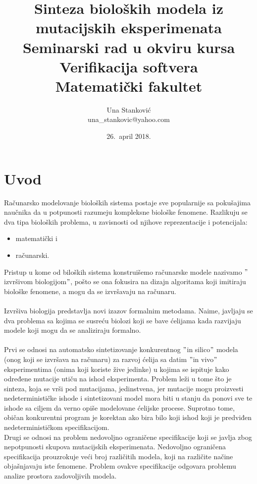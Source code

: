 \documentclass[a4paper]{article}
\begin{document}
\title{Sinteza bioloških modela iz mutacijskih eksperimenata\\ \small{Seminarski rad u okviru kursa\\Verifikacija softvera\\ Matematički fakultet}}

\author{Una Stanković\\una\_stankovic@yahoo.com}
\date{26.~april 2018.}
\maketitle

\tableofcontents

\newpage

\section{Uvod}
\label{sec:uvod}
Računarsko modelovanje bioloških sistema postaje sve popularnije sa pokušajima naučnika da u potpunosti razumeju kompleksne biološke fenomene.
Razlikuju se dva tipa bioloških problema, u zavisnosti od njihove reprezentacije i potencijala:
\begin{itemize}
\item matematički i
\item računarski.
\end{itemize} 
Pristup u kome od biloških sistema konstruišemo računarske modele nazivamo $"$izvršivom biologijom$"$, pošto se ona fokusira na dizajn algoritama koji imitiraju biološke fenomene, a mogu da se izvršavaju na računaru.\cite{execbio} \\\\
Izvršiva biologija predstavlja novi izazov formalnim metodama.
Naime, javljaju se dva problema sa kojima se susreću biolozi koji se bave ćelijama kada razvijaju modele koji mogu da se analiziraju formalno.\\\\

Prvi se odnosi na automatsko sintetizovanje konkurentnog $"$in silico$"$ modela (onog koji se izvršava na računaru) za razvoj ćelija sa datim $"$in vivo$"$ eksperimentima (onima koji koriste žive jedinke) u kojima se ispituje kako određene mutacije utiču na ishod eksperimenta. Problem leži u tome što je sinteza, koja se vrši pod mutacijama, jedinstvena, jer mutacije mogu proizvesti nedeterminističke ishode i sintetizovani model mora biti u stanju da ponovi sve te ishode sa ciljem da verno opiše modelovane ćelijske procese. Suprotno tome, običan konkurentni program je korektan ako bira bilo koji ishod koji je predviđen nedeterminističkom specifikacijom. \\
Drugi se odnosi na problem nedovoljno ograničene specifikacije koji se javlja zbog nepotpunosti skupova mutacijskih eksperimenata. Nedovoljno ograničena specifikacija prouzrokuje veći broj različitih modela, koji na različite načine objašnjavaju iste fenomene. Problem ovakve specifikacije odgovara problemu analize prostora zadovoljivih modela. 
\end{document}
